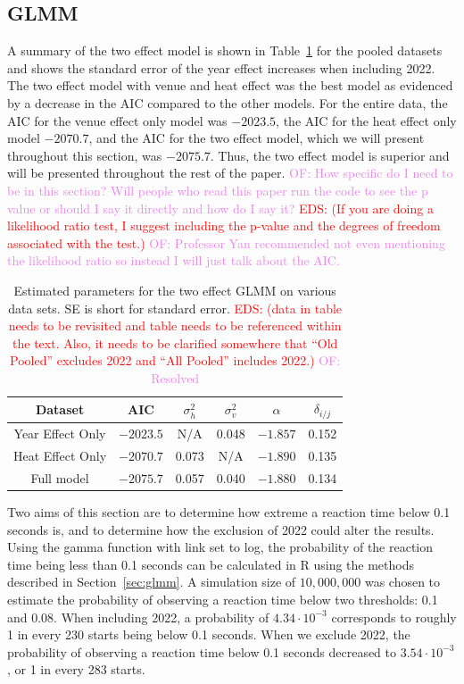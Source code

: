 \documentclass[12pt, letterpaper, titlepage]{article}
\newcommand{\eds}[1]{\textcolor{red}{EDS: (#1)}}
\newcommand{\of}[1]{\textcolor{violet}{OF: #1}}
\begin{document}
\subsection{GLMM} \label{subsec:Results_GLMM}


A summary of the two effect model is shown in Table~\ref{tab:Gamma_parameters}
for the pooled datasets and shows the standard error of the year
effect increases when including 2022.  The two effect model with venue and heat
effect was the best model as evidenced by a decrease in the AIC compared to the
other models. For the entire data, the AIC for the venue effect only model was
$-2023.5$, the AIC for the heat effect only model $-2070.7$, and the AIC for the 
two effect model, which we will present throughout this section, was $-2075.7$. 
Thus, the two effect model is superior and will be presented throughout the rest
of the paper.
\of{How specific do I need to be in this section? Will people who read this paper
run the code to see the p value or should I say it directly and how do I say it?}
\eds{If you are doing a likelihood ratio test, I suggest including the p-value 
and the degrees of freedom associated with the test.}
\of{Professor Yan recommended not even mentioning the likelihood ratio so
instead I will just talk about the AIC.}

\begin{table}
  \centering
  \caption{Estimated parameters for the two effect GLMM on various data sets. SE
  is short for standard error. \eds{data in table needs to be revisited and table
	needs to be referenced within the text. Also, it needs to be clarified 
	somewhere that ``Old Pooled'' excludes 2022 and ``All Pooled'' includes 2022.}
  \of{Resolved}} 
  \begin{tabular}{c c c c c c}
      \toprule
      Dataset & AIC & $\sigma_h^2$ & $\sigma_v^2$ & $\alpha$ & $\delta_{i/j}$ \\
      \midrule
      Year Effect Only & $-2023.5$ & N/A & 0.048 & $-1.857$ & 0.152\\
      Heat Effect Only & $-2070.7$ & 0.073 & N/A & $-1.890$ & 0.135\\
      Full model       & $-2075.7$ & 0.057 & 0.040 & $-1.880$ & 0.134\\
      \bottomrule
  \end{tabular}
  \label{tab:Gamma_parameters}
\end{table}


Two aims of this section are to determine how extreme a reaction time below
0.1 seconds is, and to determine how the exclusion of 2022 could alter the results.
Using the gamma function with link set to log, the probability of the reaction 
time being less than 0.1 seconds can be calculated in R using the methods 
described in Section~\ref{sec:glmm}. A simulation size of $10,000,000$ was 
chosen to estimate the probability of observing a reaction time below 
two thresholds: 0.1 and 0.08. When including 2022, a probability
of $4.34\cdot10^{-3}$ corresponds to roughly 1 in every 230 starts
being below 0.1 seconds.  When we exclude 2022, the probability of observing a
reaction time below 0.1 seconds decreased to $3.54\cdot10^{-3}$, or 1 in every
283 starts.
\end{document}
